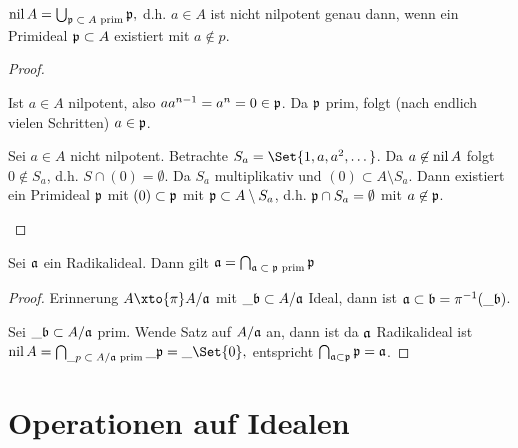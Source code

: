 \begin{st}
    \begin{math}
        \operatorname{nil} A = \bigcup_{\text{$\mathfrak{p} \subset A$ prim}} \mathfrak{p},
    \end{math}
    d.h. $a \in A$ ist nicht nilpotent genau dann, wenn ein Primideal $\mathfrak{p} \subset A$ existiert mit $a \nin p$.
    \begin{proof}
        \begin{seg}{\ProofImplication*}
            Ist $a \in A$ nilpotent, also $aa^{n-1} = a^n = 0 \in \mathfrak{p}$.
            Da $\mathfrak{p}$ prim, folgt (nach endlich vielen Schritten) $a \in \mathfrak{p}$.
        \end{seg}
        \begin{seg}{\ProofImplication}
            Sei $a \in A$ nicht nilpotent.
            Betrachte $S_a = \Set{1, a, a^2, \dotsc}$.
            Da $a \not\in \operatorname{nil} A$ folgt $0 \nin S_a$, d.h. $S \cap (0) = \emptyset$.
            Da $S_a$ multiplikativ und $(0) \subset A \setminus S_a$.
            Dann existiert ein Primideal $\mathfrak{p}$ mit $(0) \subset \mathfrak{p}$ mit $\mathfrak{p} \subset A \setminus S_a$, d.h. $\mathfrak{p} \cap S_a = \emptyset$ mit $a \not\in \mathfrak{p}$.
        \end{seg}
    \end{proof}
\end{st}

\begin{kor}
    Sei $\mathfrak{a}$ ein Radikalideal.
    Dann gilt
    \begin{math}
        \mathfrak{a} = \bigcap_{\text{$\mathfrak{a} \subset \mathfrak{p}$ prim}} \mathfrak{p}
    \end{math}
    \begin{proof}
        Erinnerung $A \xto{\pi} A / \frk a$ mit $\_{\mathfrak{b}} \subset A / \mathfrak{a}$ Ideal, dann ist $\mathfrak{a} \subset \mathfrak{b} = \pi^{-1}(\_{\mathfrak{b}})$.

        Sei $\_{\mathfrak{b}} \subset A / \mathfrak{a}$ prim.
        Wende Satz auf $A / \mathfrak{a}$ an, dann ist da $\mathfrak{a}$ Radikalideal ist
        \begin{math}
            \nil A = \bigcap_{\text{$\_p \subset A / \frk a$ prim}} \_{\frk p} = \_{\Set{0}},
        \end{math}
        entspricht $\bigcap_{\mathfrak{a} \subset \mathfrak{p}} \mathfrak{p} = \mathfrak{a}$.
    \end{proof}
\end{kor}


\section{Operationen auf Idealen}

